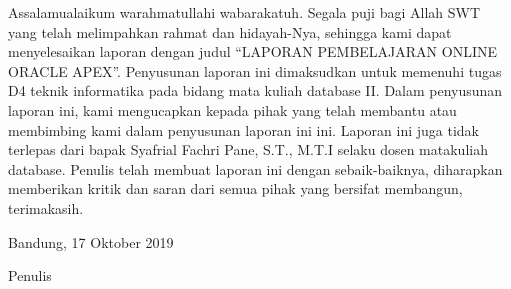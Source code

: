 \begin{acknowledgements}
\par
Assalamualaikum warahmatullahi wabarakatuh. Segala puji bagi Allah SWT yang telah melimpahkan rahmat dan hidayah-Nya, sehingga kami dapat menyelesaikan laporan dengan judul “LAPORAN PEMBELAJARAN ONLINE ORACLE APEX”.
Penyusunan laporan ini dimaksudkan untuk memenuhi tugas D4 teknik informatika pada bidang mata kuliah database II. Dalam penyusunan laporan ini, kami mengucapkan kepada pihak yang telah membantu atau membimbing kami dalam penyusunan laporan ini ini. Laporan ini juga tidak terlepas dari bapak Syafrial Fachri Pane, S.T., M.T.I selaku dosen matakuliah database. Penulis telah membuat laporan ini dengan sebaik-baiknya, diharapkan memberikan kritik dan saran dari semua pihak yang bersifat membangun, terimakasih.

\begin{raggedleft}




Bandung, 17 Oktober 2019

Penulis

\end{raggedleft}

\end{acknowledgements}